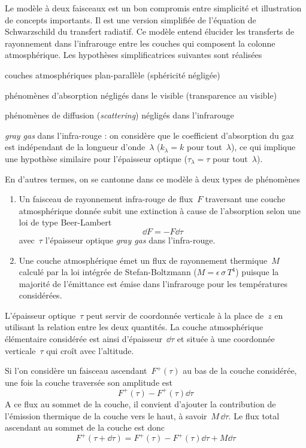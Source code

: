 \sk
Le modèle à deux faisceaux est un bon compromis entre simplicité
et illustration de concepts importants. Il est une version simplifiée
de l'équation de Schwarzschild du transfert radiatif.
Ce modèle entend élucider
les transferts de rayonnement dans l'infrarouge entre
les couches qui composent la colonne atmosphérique. Les
hypothèses simplificatrices suivantes sont réalisées
\begin{citemize}
\item couches atmosphériques plan-parallèle (sphéricité négligée)
\item phénomènes d'absorption négligés dans le visible (transparence au visible)
\item phénomènes de diffusion (\emph{scattering}) négligés dans l'infrarouge
\item \emph{gray gas} dans l'infra-rouge : on considère que le coefficient d'absorption
du gaz est indépendant de la longueur d'onde~$\lambda$ ($k_{\lambda} = k$ pour tout~$\lambda$),
ce qui implique une hypothèse similaire pour l'épaisseur optique ($\tau_{\lambda} = \tau$ pour tout~$\lambda$).
\end{citemize}
En d'autres termes, on se cantonne dans ce modèle à deux types de phénomènes
\begin{enumerate}
\item Un faisceau de rayonnement infra-rouge de flux~$F$ traversant une couche 
atmosphérique donnée
subit une extinction à cause de l'absorption selon une loi de type Beer-Lambert
\[
\dd F = - F \dd \tau
\]
avec~$\tau$ l'épaisseur optique \emph{gray gas} 
dans l'infra-rouge.
\item Une couche atmosphérique émet un flux de rayonnement thermique~$M$ 
calculé par la loi intégrée de Stefan-Boltzmann ($M=\epsilon\,\sigma\,T^4$)
puisque la majorité de l'émittance est émise dans l'infrarouge pour les températures considérées.
\end{enumerate}

\sk
L'épaisseur optique~$\tau$ peut servir de coordonnée verticale à la place de~$z$
en utilisant la relation entre les deux quantités. La couche atmosphérique
élémentaire considérée est ainsi d'épaisseur~$\dd\tau$ et située à une coordonnée
verticale~$\tau$ qui croît avec l'altitude. 

\sk
Si l'on considère un faisceau ascendant~$F^+(\tau)$ au bas de la couche considérée,
une fois la couche traversée son amplitude est
\[
F^+(\tau) - F^+(\tau) \dd\tau
\]
A ce flux au sommet de la couche, il convient d'ajouter
la contribution de l'émission thermique de la couche vers 
le haut, à savoir~$M\,\dd\tau$.
Le flux total ascendant au sommet de la couche est donc
\[
F^+(\tau+\dd\tau) = F^+(\tau) - F^+(\tau) \dd\tau + M\dd\tau
\]

